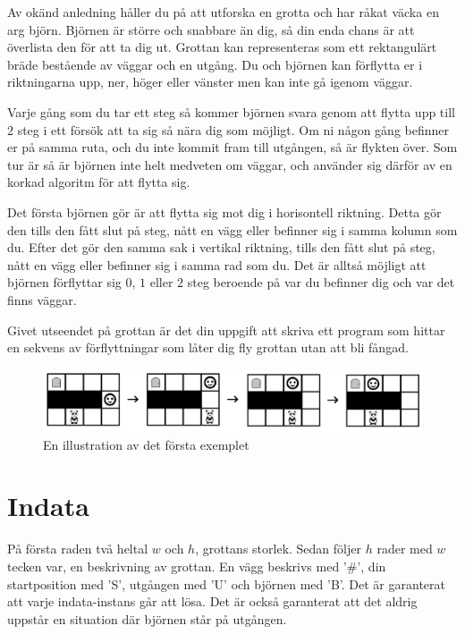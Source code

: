 Av okänd anledning håller du på att utforska en grotta och har råkat väcka en arg björn. Björnen är större och snabbare än dig, så din enda chans är att överlista den för att ta dig ut. Grottan kan representeras som ett rektangulärt bräde bestående av väggar och en utgång. Du och björnen kan förflytta er i riktningarna upp, ner, höger eller vänster men kan inte gå igenom väggar.

Varje gång som du tar ett steg så kommer björnen svara genom att flytta upp till $2$ steg i ett försök att ta sig så nära dig som möjligt. Om ni någon gång befinner er på samma ruta, och du inte kommit fram till utgången, så är flykten över. Som tur är så är björnen inte helt medveten om väggar, och använder sig därför av en korkad algoritm för att flytta sig.

Det första björnen gör är att flytta sig mot dig i horisontell riktning. Detta gör den tills den fått slut på steg, nått en vägg eller befinner sig i samma kolumn som du. Efter det gör den samma sak i vertikal riktning, tills den fått slut på steg, nått en vägg eller befinner sig i samma rad som du. Det är alltså möjligt att björnen förflyttar sig $0$, $1$ eller $2$ steg beroende på var du befinner dig och var det finns väggar.

Givet utseendet på grottan är det din uppgift att skriva ett program som hittar en sekvens av förflyttningar som låter dig fly grottan utan att bli fångad.

\begin{figure}[ht!]
\centering
\includegraphics[width=\textwidth]{grottflykt.png}
\caption{En illustration av det första exemplet}
\label{overflow}
\end{figure}

\section*{Indata}
På första raden två heltal $w$ och $h$, grottans storlek. Sedan följer $h$ rader med $w$ tecken var, en beskrivning av grottan. En vägg beskrivs med '\#', din startposition med 'S', utgången med 'U' och björnen med 'B'. Det är garanterat att varje indata-instans går att lösa. Det är också garanterat att det aldrig uppstår en situation där björnen står på utgången.

